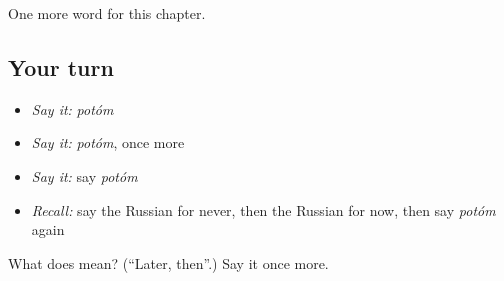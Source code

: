 \begin{grammarlens}[title={What you've built}]
One more word for this chapter.
\end{grammarlens}

\subsection*{Your turn}
\begin{itemize}
\raggedright
  \item \emph{Say it:} \emph{potóm}
  \item \emph{Say it:} \emph{potóm}, once more
  \item \emph{Say it:} say \emph{potóm}
  \item \emph{Recall:} say the Russian for never, then the Russian for now, then say \emph{potóm} again
\end{itemize}

\begin{tcolorbox}[breakable,colback=teal!4,colframe=teal!35!black,title={Before you move on}]
What does  mean? (\textquotedblleft{}Later, then\textquotedblright{}.) Say it once more.
\end{tcolorbox}
